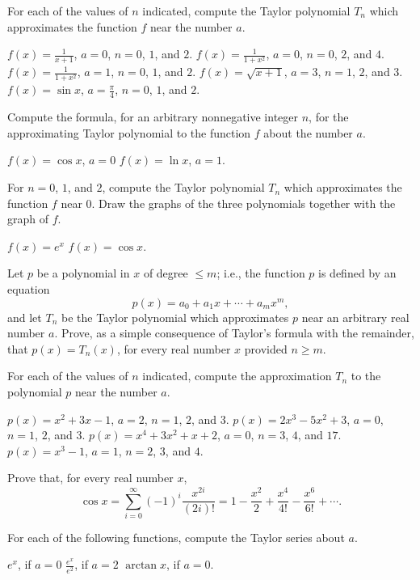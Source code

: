 \begin{exercises}

For each of the values of $n$ indicated,
compute the Taylor polynomial $T_n$
which approximates the function $f$ near
the number $a$.
\begin{exenum}
\x
$f(x) = \frac1{x+1}$, $a=0$, $n=0$, $1$, and $2$.
\x
$f(x) = \frac1{1+x^2}$, $a=0$, $n=0$, $2$, and $4$.
\x
$f(x) = \frac1{1+x^2}$, $a=1$, $n=0$, $1$, and $2$.
\x
$f(x) = \sqrt{x+1}$, $a=3$, $n=1$, $2$, and $3$.
\x
$f(x) = \sin x$, $a=\frac{\pi}4$, $n=0$, $1$, and $2$.
\end{exenum}

Compute the formula,
for an arbitrary nonnegative integer $n$,
for the approximating Taylor polynomial
to the function $f$ about the number $a$.
\begin{exenum}
\x
$f(x) = \cos x$, \quad $a=0$
\x
$f(x) = \ln x$, \quad $a=1$.
\end{exenum}

For $n=0$, $1$, and $2$, compute the Taylor
polynomial $T_n$ which approximates the
function $f$ near $0$.
Draw the graphs of the three polynomials together
with the graph of $f$.
\begin{exenum}
\x
$f(x) = e^x$
\x
$f(x) = \cos x$.
\end{exenum}

Let $p$ be a polynomial in $x$ of degree
$\leq m$; i.e., the function $p$ is defined
by an equation
\[
p(x) = a_0 + a_1x + \cdots + a_mx^m
,
\]
and let $T_n$ be the Taylor polynomial which
approximates $p$ near an arbitrary real number
$a$.  Prove, as a simple consequence of
Taylor's formula with the remainder,
that $p(x) = T_n(x)$, for every real number $x$
provided $n \geq m$.

For each of the values of $n$ indicated,
compute the approximation $T_n$ to the
polynomial $p$ near the number $a$.
\begin{exenum}
\x
$p(x) = x^2+3x-1$, $a=2$, $n=1$, $2$, and $3$.
\x
$p(x) = 2x^3-5x^2+3$, $a=0$, $n=1$, $2$, and $3$.
\x
$p(x) = x^4+3x^2+x+2$, $a=0$,
$n=3$, $4$, and $17$.
\x
$p(x) = x^3-1$, $a=1$, $n=2$, $3$, and $4$.
\end{exenum}

Prove that, for every real number $x$,
\[
\cos x = \sum_{i=0}^\infty (-1)^i
\frac{x^{2i}}{(2i)!} =
1 - \frac{x^2}2 + \frac{x^4}{4!} - \frac{x^6}{6!} + \cdots
.
\]

For each of the following functions,
compute the Taylor series about $a$.
\begin{exenum}
\x
$e^x$, if $a=0$
\x
$\frac{e^x}{e^2}$, if $a=2$
\x
$\arctan x$, if $a=0$.
\end{exenum}


\end{exercises}
